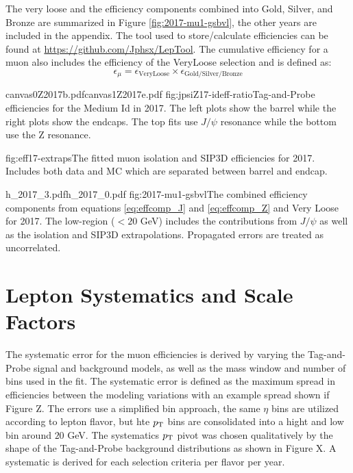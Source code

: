 The very loose and the efficiency components combined into Gold, Silver, and Bronze are summarized in Figure \ref{fig:2017-mu1-gsbvl}, the other years are included in the appendix. The tool used to store/calculate efficiencies can be found at \url{https://github.com/Jphsx/LepTool}.  The cumulative efficiency for a muon also includes the efficiency of the VeryLoose selection and is defined as:
\begin{equation}
\epsilon_\mu = \epsilon_{\text{VeryLoose}} \times \epsilon_{\text{Gold/Silver/Bronze}}
\end{equation}



%
           {canvas0Z2017b.pdf}{canvas1Z2017e.pdf}%
          {fig:jpsiZ17-ideff-ratio}{Tag-and-Probe efficiencies for the Medium Id in 2017. The left plots show the barrel while the right plots show the endcaps. The top fits use $J/\psi$ resonance while the bottom use the Z resonance. }

%
          {fig:eff17-extraps}{The fitted muon isolation and SIP3D efficiencies for 2017. Includes both data and MC which are separated between barrel and endcap.  }



		   {h_2017_3.pdf}{h_2017_0.pdf}
		   {fig:2017-mu1-gsbvl}{The combined efficiency components from equations \ref{eq:effcomp_J} and \ref{eq:effcomp_Z} and Very Loose for 2017. The low-\pt region ($<20$ GeV) includes the contributions from $J/\psi$ as well as the isolation and SIP3D extrapolations. Propagated errors are treated as uncorrelated.}


\section{Lepton Systematics and Scale Factors}

The systematic error for the muon efficiencies is derived by varying the Tag-and-Probe signal and background models, as well as the mass window and number of bins used in the fit. The systematic error is defined as the maximum spread in efficiencies between the modeling variations with an example spread shown if Figure Z.  The errors use a simplified bin approach, the same $\eta$ bins are utilized according to lepton flavor, but hte $p_{\mathrm{T}}$ bins are consolidated into a hight and low bin around $20$ GeV. The systematics $p_{\mathrm{T}}$ pivot was chosen qualitatively by the shape of the Tag-and-Probe background distributions as shown in Figure X. A systematic is derived for each selection criteria per flavor per year. 

